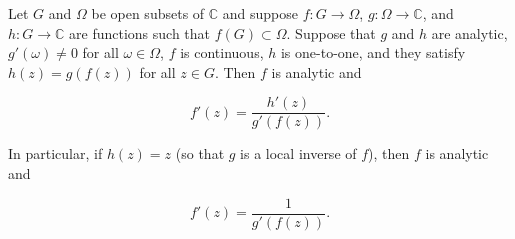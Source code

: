 Let $G$ and $\Omega$ be open subsets of $\mathbb{C}$ and suppose $f : G \to \Omega$, $g : \Omega \to \mathbb{C}$, and $h : G \to \mathbb{C}$ are functions such that $f(G) \subset \Omega$. Suppose that $g$ and $h$ are analytic, $g'(\omega) \neq 0$ for all $\omega \in \Omega$, $f$ is continuous, $h$ is one-to-one, and they satisfy $h(z) = g(f(z))$ for all $z \in G$. Then $f$ is analytic and

$$f'(z) = \frac{h'(z)}{g'(f(z))}.$$

In particular, if $h(z) = z$ (so that $g$ is a local inverse of $f$), then $f$ is analytic and

$$f'(z) = \frac{1}{g'(f(z))}.$$
